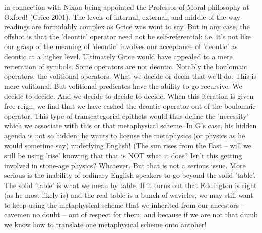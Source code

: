 \documentclass[10pt,titlepage]{book}
\begin{document}
in  connection with Nixon being appointed the Professor of Moral philosophy 
at  Oxford! (Grice 2001). The levels of internal, external, and 
middle-of-the-way  readings are formidably complex as Grice was wont to say. But in any 
case, the  offshot is that the 'deontic' operator need not be 
self-referential: i.e. it's  not like our grasp of the meaning of 'deontic' involves our 
acceptance of  'deontic' as deontic at a higher level. Ultimately Grice would 
have appealed to  a mere reiteration of symbols. Some operators are not 
deontic. Notably the  boulomaic operators, the volitional operators. What we 
decide or deem that  we'll do. This is mere volitional. But volitional 
predicates have the ability to  go recursive. We decide to decide. And we decide 
to decide to decide. When this  iteration is given free reign, we find that 
we have cashed the deontic operator  out of the boulomaic operator. This type 
of transcategorial epithets would  thus define the 'necessity' which we 
associate with this or that metaphysical  scheme. In G's case, his hidden 
agenda is not so hidden: he wants to license the  metaphysics (or physics as he 
would sometime say) underlying English! (The sun  rises from the East -- will 
we still be using 'rise' knowing that that is NOT  what it does? Isn't this 
getting involved in stone-age physics? Whatever. But  that is not a serious 
issue. More serious is the inability of ordinary English  speakers to go 
beyond the solid 'table'. The solid 'table' is what we mean by  table. If it 
turns out that Eddington is right (as he most likely is) and the  real table 
is a bunch of wavicles, we may still want to keep using the  metaphysical 
scheme that we inherited from our ancestors -- cavemen no doubt --  out of 
respect for them, and because if we are not that dumb we know how to  
translate one metaphysical scheme onto antoher!
 
\end{document}
